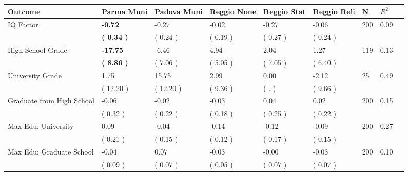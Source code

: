 \begin{tabular}{L{6.2cm} C{1.8cm} C{1.8cm} C{1.8cm} C{1.8cm} C{1.8cm} C{1.8cm} C{0.3cm} C{0.3cm}}
\toprule
 \textbf{Outcome} & \textbf{Parma Muni} & \textbf{Padova Muni} & \textbf{Reggio None} & \textbf{Reggio Stat} & \textbf{Reggio Reli} & \textbf{N} & \textbf{$ R^2$} \\
\midrule
IQ Factor & \textbf{    -0.72} &     -0.27 &     -0.02 &     -0.27 &     -0.06  & 200 &       0.09 \\ 
 & \textbf{(     0.34 )} & (     0.24 ) & (     0.19 ) & (     0.27 ) & (     0.24 )  & \\
High School Grade & \textbf{   -17.75} &     -6.46 &      4.94 &      2.04 &      1.27  & 119 &       0.13 \\ 
 & \textbf{(     8.86 )} & (     7.06 ) & (     5.05 ) & (     7.05 ) & (     6.40 )  & \\
University Grade &      1.75 &     15.75 &      2.99 &      0.00 &     -2.12  & 25 &       0.49 \\ 
 & (    12.20 ) & (    12.20 ) & (     9.36 ) & (        . ) & (     9.66 )  & \\
Graduate from High School &     -0.06 &     -0.02 &     -0.03 &      0.04 &      0.02  & 200 &       0.15 \\ 
 & (     0.32 ) & (     0.22 ) & (     0.18 ) & (     0.25 ) & (     0.22 )  & \\
Max Edu: University &      0.09 &     -0.04 &     -0.14 &     -0.12 &     -0.09  & 200 &       0.27 \\ 
 & (     0.21 ) & (     0.15 ) & (     0.12 ) & (     0.17 ) & (     0.15 )  & \\
Max Edu: Graduate School &     -0.04 &      0.07 &     -0.03 &     -0.00 &     -0.03  & 200 &       0.10 \\ 
 & (     0.09 ) & (     0.07 ) & (     0.05 ) & (     0.07 ) & (     0.07 )  & \\
\bottomrule
\end{tabular}
